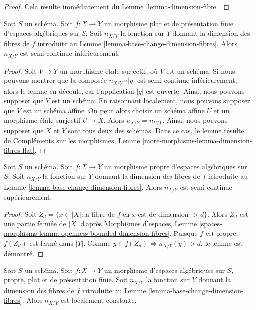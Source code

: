 \begin{proof}
Cela résulte immédiatement du
Lemme \ref{lemma-dimension-fibre}.
\end{proof}

\begin{lemma}
\label{lemma-dimension-fibres-flat}
Soit $S$ un schéma.
Soit $f : X \to Y$ un morphisme plat et de présentation finie
d'espaces algébriques sur $S$. Soit
$n_{X/Y}$ la fonction sur $Y$ donnant la dimension des fibres de $f$
introduite au Lemme \ref{lemma-base-change-dimension-fibres}.
Alors $n_{X/Y}$ est semi-continue inférieurement.
\end{lemma}

\begin{proof}
Soit $V \to Y$ un morphisme étale surjectif, où $V$ est un schéma.
Si nous pouvons montrer que la composée $n_{X/Y} \circ |g|$
est semi-continue inférieurement, alors le lemme en découle, car l'application $|g|$ est ouverte.
Ainsi, nous pouvons supposer que $Y$ est un schéma.
En raisonnant localement, nous pouvons supposer que $V$ est un schéma affine.
On peut alors choisir un schéma affine $U$ et un morphisme
étale surjectif $U \to X$. Alors $n_{X/Y} = n_{U/Y}$.
Ainsi, nous pouvons supposer que $X$ et $Y$ sont tous deux des schémas.
Dans ce cas, le lemme résulte de
Compléments sur les morphismes, Lemme \ref{more-morphisms-lemma-dimension-fibres-flat}.
\end{proof}

\begin{lemma}
\label{lemma-dimension-fibres-proper}
Soit $S$ un schéma.
Soit $f : X \to Y$ un morphisme propre d'espaces algébriques sur $S$. Soit
$n_{X/Y}$ la fonction sur $Y$ donnant la dimension des fibres de $f$
introduite au Lemme \ref{lemma-base-change-dimension-fibres}.
Alors $n_{X/Y}$ est semi-continue supérieurement.
\end{lemma}

\begin{proof}
Soit $Z_d = \{x \in |X| :
\text{la fibre de }f\text{ en }x\text{ est de dimension }> d\}$.
Alors $Z_d$ est une partie fermée de $|X|$ d'après
Morphismes d'espaces, Lemme
\ref{spaces-morphisms-lemma-openness-bounded-dimension-fibres}.
Puisque $f$ est propre, $f(Z_d)$ est fermé dans $|Y|$.
Comme $y \in f(Z_d) \Leftrightarrow n_{X/Y}(y) > d$,
le lemme est démontré.
\end{proof}

\begin{lemma}
\label{lemma-dimension-fibres-proper-flat}
Soit $S$ un schéma. Soit $f : X \to Y$ un morphisme d'espaces algébriques
sur $S$, propre, plat et de présentation finie.
Soit $n_{X/Y}$ la fonction sur $Y$ donnant la dimension des fibres de $f$
introduite au Lemme \ref{lemma-base-change-dimension-fibres}.
Alors $n_{X/Y}$ est localement constante.
\end{lemma}

